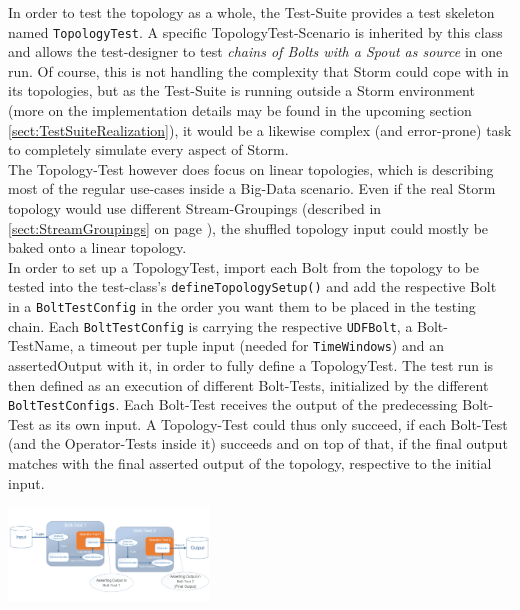 \begin{description}
		In order to test the topology as a whole, the Test-Suite provides a test skeleton named \texttt{TopologyTest}. A specific TopologyTest-Scenario is inherited by this class and allows the test-designer to test \textit{chains of Bolts with a Spout as source} in one run. Of course, this is not handling the complexity that Storm could cope with in its topologies, but as the Test-Suite is running outside a Storm environment (more on the implementation details may be found in the upcoming section \ref{sect:TestSuiteRealization}), it would be a likewise complex (and error-prone) task to completely simulate every aspect of Storm.\\
		The Topology-Test however does focus on linear topologies, which is describing most of the regular use-cases inside a Big-Data scenario. Even if the real Storm topology would use different Stream-Groupings (described in \ref{sect:StreamGroupings} on page \pageref{sect:StreamGroupings}), the shuffled topology input could mostly be baked onto a linear topology. \\
		In order to set up a TopologyTest, import each Bolt from the topology to be tested into the test-class's \texttt{defineTopologySetup()} and add the respective Bolt in a \texttt{BoltTestConfig} in the order you want them to be placed in the testing chain. Each \texttt{BoltTestConfig} is carrying the respective \texttt{UDFBolt}, a Bolt-TestName, a timeout per tuple input (needed for \texttt{TimeWindows}) and an assertedOutput with it, in order to fully define a TopologyTest. The test run is then defined as an execution of different Bolt-Tests, initialized by the different \texttt{BoltTestConfigs}. Each Bolt-Test receives the output of the predecessing Bolt-Test as its own input. A Topology-Test could thus only succeed, if each Bolt-Test (and the Operator-Tests inside it) succeeds and on top of that, if the final output matches with the final asserted output of the topology, respective to the initial input.
		\begin{center}
			\includegraphics[width=0.4\textwidth]{./images/09_testing/TopologyTest.pdf}
		\end{center}
		
	\end{description}

